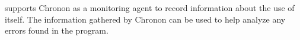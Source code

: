 \app{} supports Chronon as a monitoring agent to record information about the use of \app{} itself.
The information gathered by Chronon can be used to help analyze any errors found in the program. 


